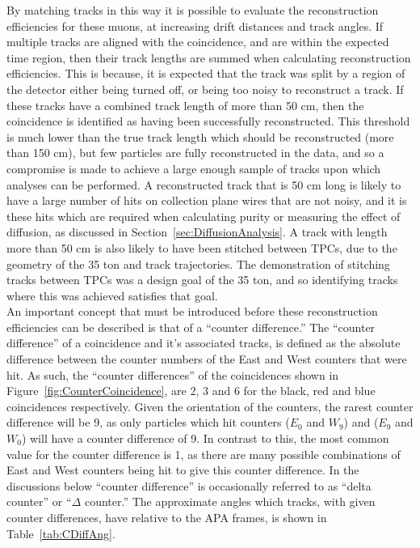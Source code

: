 By matching tracks in this way it is possible to evaluate the reconstruction efficiencies for these muons, at increasing drift distances and track angles. If multiple tracks are aligned with the coincidence, and are within the expected time region, then their track lengths are summed when calculating reconstruction efficiencies. This is because, it is expected that the track was split by a region of the detector either being turned off, or being too noisy to reconstruct a track. If these tracks have a combined track length of more than 50 cm, then the coincidence is identified as having been successfully reconstructed. This threshold is much lower than the true track length which should be reconstructed (more than 150 cm), but few particles are fully reconstructed in the data, and so a compromise is made to achieve a large enough sample of tracks upon which analyses can be performed. A reconstructed track that is 50 cm long is likely to have a large number of hits on collection plane wires that are not noisy, and it is these hits which are required when calculating purity or measuring the effect of diffusion, as discussed in Section~\ref{sec:DiffusionAnalysis}. A track with length more than 50 cm is also likely to have been stitched between TPCs, due to the geometry of the 35 ton and track trajectories. The demonstration of stitching tracks between TPCs was a design goal of the 35 ton, and so identifying tracks where this was achieved satisfies that goal. \\

An important concept that must be introduced before these reconstruction efficiencies can be described is that of a ``counter difference.'' The ``counter difference'' of a coincidence and it's associated tracks, is defined as the absolute difference between the counter numbers of the East and West counters that were hit. As such, the ``counter differences'' of the coincidences shown in Figure~\ref{fig:CounterCoincidence}, are 2, 3 and 6 for the black, red and blue coincidences respectively. Given the orientation of the counters, the rarest counter difference will be 9, as only particles which hit counters ($E_0$ and $W_9$) and ($E_9$ and $W_0$) will have a counter difference of 9. In contrast to this, the most common value for the counter difference is 1, as there are many possible combinations of East and West counters being hit to give this counter difference. In the discussions below ``counter difference'' is occasionally referred to as ``delta counter'' or ``$\Delta$ counter.'' The approximate angles which tracks, with given counter differences, have relative to the APA frames, is shown in Table~\ref{tab:CDiffAng}. \\

